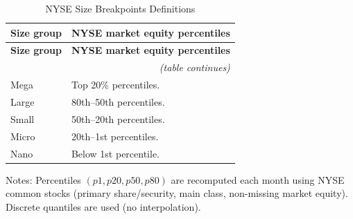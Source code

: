 \documentclass[12pt,title,fleqn]{article}
\begin{document}
{\scriptsize
\begin{longtable}{|p{}|p{}|}
\caption{NYSE Size Breakpoints Definitions}\label{app:nyse-breakpoints}\\
\hline
\textbf{Size group} & \textbf{NYSE market equity percentiles} \\
\hline
\endfirsthead

\hline
\textbf{Size group} & \textbf{NYSE market equity percentiles} \\
\hline
\endhead

\hline
\multicolumn{2}{r}{\textit{(table continues)}}\\
\endfoot

\hline
\endlastfoot

Mega\rule{0pt}{10pt}  & Top 20\% percentiles. \\[1ex]

Large & 80th--50th percentiles. \\[1ex]

Small & 50th--20th percentiles. \\[1ex]

Micro & 20th--1st percentiles. \\[1ex]

Nano  & Below 1st percentile. \\
\end{longtable}
\vspace{-0.4\baselineskip}
\noindent\footnotesize Notes: Percentiles \((p1,p20,p50,p80)\) are recomputed each month using NYSE common stocks (primary share/security, main class, non-missing market equity). Discrete quantiles are used (no interpolation).
}
\end{document}
